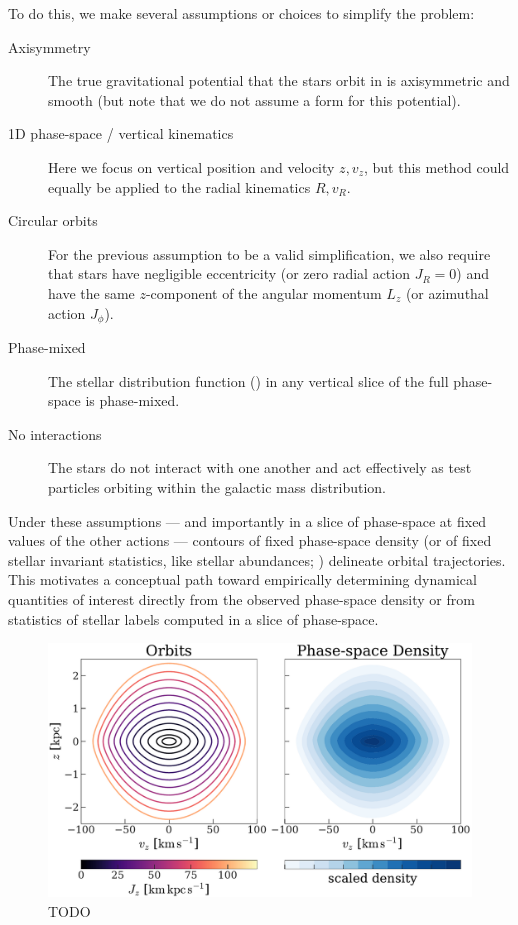 To do this, we make several assumptions or choices to simplify the problem:
\begin{description}
    \item[Axisymmetry] The true gravitational potential that the stars orbit in is
    axisymmetric and smooth (but note that we do not assume a form for this potential).
    \item[1D phase-space / vertical kinematics] Here we focus on vertical position and
    velocity $z, v_z$, but this method could equally be applied to the radial kinematics
    $R, v_R$.
    \item[Circular orbits] For the previous assumption to be a valid simplification, we
    also require that stars have negligible eccentricity (or zero radial action $J_R=0$)
    and have the same $z$-component of the angular momentum $L_z$ (or azimuthal action
    $J_\phi$).
    \item[Phase-mixed] The stellar distribution function (\df) in any vertical slice of
    the full phase-space is phase-mixed.
    \item[No interactions] The stars do not interact with one another and act
    effectively as test particles orbiting within the galactic mass distribution.
\end{description}
Under these assumptions --- and importantly in a slice of phase-space at fixed values of
the other actions --- contours of fixed phase-space density (or of fixed stellar
invariant statistics, like stellar abundances; \citealt{Price-Whelan:2021}) delineate
orbital trajectories.
This motivates a conceptual path toward empirically determining dynamical quantities of
interest directly from the observed phase-space density or from statistics of stellar
labels computed in a slice of phase-space.

\begin{figure}[!th]
\begin{center}
\includegraphics[width=\textwidth]{illustrate-zvz.pdf}
\end{center}
\caption{%
TODO
\label{fig:zvz}
}
\end{figure}

